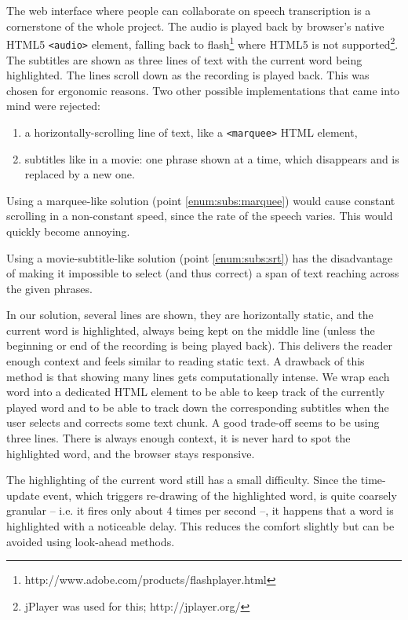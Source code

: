 \documentclass{llncs}
\begin{document}
The web interface where people can collaborate on speech transcription is a
cornerstone of the whole project. The audio is played back by browser's native
HTML5 \texttt{\textless{}audio\textgreater} element, falling back to
flash\footnote{http://www.adobe.com/products/flashplayer.html} where HTML5 is
not supported\footnote{jPlayer was used for this; http://jplayer.org/}. The
subtitles are shown as three lines of text with the current word being
highlighted. The lines scroll down as the recording is played back. This was
chosen for ergonomic reasons. Two other possible implementations that came into
mind were rejected:
\begin{enumerate}
\item{a horizontally-scrolling line of text, like a
\texttt{\textless{}marquee\textgreater} HTML element,\label{enum:subs:marquee}}
\item{subtitles like in a movie: one phrase shown at a time, which disappears
and is replaced by a new one.\label{enum:subs:srt}}
\end{enumerate}
Using a marquee-like solution (point \ref{enum:subs:marquee}) would cause
constant scrolling in a non-constant speed, since the rate of the speech varies.
This would quickly become annoying.

Using a movie-subtitle-like solution (point \ref{enum:subs:srt}) has the
disadvantage of making it impossible to select (and thus correct) a span of
text reaching across the given phrases.

In our solution, several lines are shown, they are horizontally static, and the
current word is highlighted, always being kept on the middle line (unless the
beginning or end of the recording is being played back). This delivers the reader enough
context and feels similar to reading static text. A drawback of
this method is that showing many lines gets computationally intense. We wrap
each word into a dedicated HTML element to be able to keep track of the
currently played word and to be able to track down the corresponding subtitles
when the user selects and corrects some text chunk. A good trade-off seems to be using
three lines. There is always enough context, it is never hard to spot the
highlighted word, and the browser stays responsive.

The highlighting of the current word still has a small difficulty. Since the
time-update event, which triggers re-drawing of the highlighted word, is quite
coarsely granular -- i.e. it fires only about 4 times per second --, it happens that
a word is highlighted with a noticeable delay. This reduces the comfort slightly
but can be avoided using look-ahead methods.
\end{document}
